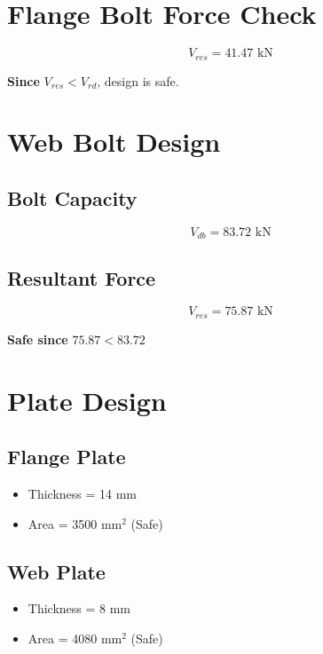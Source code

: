 \section{Flange Bolt Force Check}

\begin{equation}
V_{res} = 41.47 \text{ kN}
\end{equation}

\textbf{Since } $V_{res} < V_{rd}$, design is safe.

\section{Web Bolt Design}

\subsection{Bolt Capacity}

\begin{equation}
V_{db} = 83.72 \text{ kN}
\end{equation}

\subsection{Resultant Force}

\begin{equation}
V_{res} = 75.87 \text{ kN}
\end{equation}

\textbf{Safe since } $75.87 < 83.72$

\section{Plate Design}

\subsection{Flange Plate}
\begin{itemize}
    \item Thickness = 14 mm
    \item Area = 3500 mm$^2$ (Safe)
\end{itemize}

\subsection{Web Plate}
\begin{itemize}
    \item Thickness = 8 mm
    \item Area = 4080 mm$^2$ (Safe)
\end{itemize}

